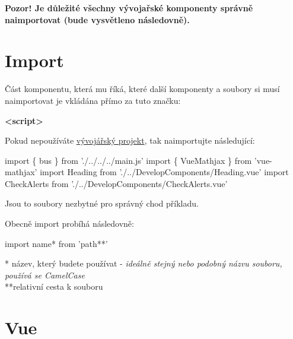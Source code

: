 \documentclass[
]{article}
\newenvironment{Shaded}{}{}
\newcommand{\ImportTok}[1]{#1}
\newcommand{\KeywordTok}[1]{\textcolor[rgb]{0.00,0.44,0.13}{\textbf{#1}}}
\newcommand{\NormalTok}[1]{#1}
\newcommand{\OperatorTok}[1]{\textcolor[rgb]{0.40,0.40,0.40}{#1}}
\newcommand{\StringTok}[1]{\textcolor[rgb]{0.25,0.44,0.63}{#1}}
\begin{document}
\textbf{Pozor! Je důležité všechny vývojařské komponenty správně
naimportovat (bude vysvětleno následovně).}

\hypertarget{import}{%
\section{Import}\label{import}}

Část komponentu, která mu říká, které další komponenty a soubory si musí
naimportovat je vkládána přímo za tuto značku:

\begin{Shaded}
\begin{Highlighting}[]
\KeywordTok{<script>}
\end{Highlighting}
\end{Shaded}

Pokud nepoužíváte
\href{https://github.com/kubajj/ComputatisDevelopmentProject}{vývojářský
projekt}, tak naimportujte následující:

\begin{Shaded}
\begin{Highlighting}[]
    \ImportTok{import} \OperatorTok{\{}\NormalTok{ bus }\OperatorTok{\}} \ImportTok{from} \StringTok{'./../../../main.js'}
    \ImportTok{import} \OperatorTok{\{}\NormalTok{ VueMathjax }\OperatorTok{\}} \ImportTok{from} \StringTok{'vue-mathjax'}
    \ImportTok{import}\NormalTok{ Heading }\ImportTok{from} \StringTok{'./../DevelopComponents/Heading.vue'}
    \ImportTok{import}\NormalTok{ CheckAlerts }\ImportTok{from} \StringTok{'./../DevelopComponents/CheckAlerts.vue'}
\end{Highlighting}
\end{Shaded}

Jsou to soubory nezbytné pro správný chod příkladu.

Obecně import probíhá následovně:

\begin{Shaded}
\begin{Highlighting}[]
\ImportTok{import}\NormalTok{ name}\OperatorTok{*} \ImportTok{from} \StringTok{'path**'}
\end{Highlighting}
\end{Shaded}

* název, který budete používat - \emph{ideálně stejný nebo podobný názvu
souboru, používá se CamelCase}\\
**relativní cesta k souboru

\hypertarget{vue}{%
\section{Vue}\label{vue}}
\end{document}
